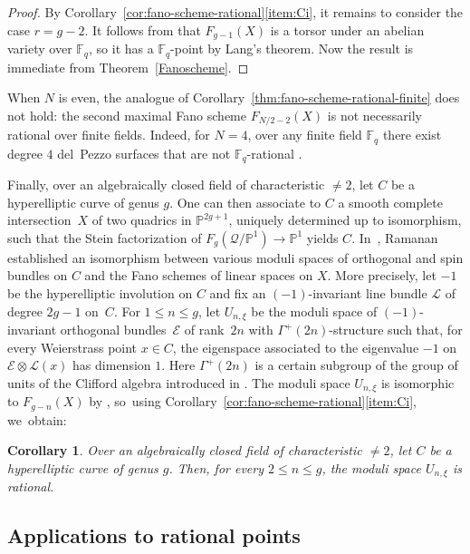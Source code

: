 \documentclass[JEP,XML,SOM,Unicode,NoEqCountersInSection,published]{cedram}
\let\bb\mathbb\let\Bbb\mathbb
\theoremstyle{plain}
\newtheorem{cor}[thm]{Corollary}
\theoremstyle{definition}
\renewcommand\P{\mathbb{P}}
\newcommand\F{\mathbb{F}}
\begin{document}
\begin{proof}
By Corollary~\ref{cor:fano-scheme-rational}\eqref{item:Ci}, it remains to consider the case $r=g-2$.
It follows from \cite[Th.\,4.8]{Reid-thesis} that $F_{g-1}(X)$ is a torsor under an abelian variety over \(\bb F_q\),
so it has a \(\bb F_q\)-point by Lang's theorem.
Now the result is immediate from Theorem~\ref{Fanoscheme}.
\end{proof}

When $N$ is even, the analogue of Corollary~\ref{thm:fano-scheme-rational-finite} does not hold: the second maximal Fano scheme \(F_{N/2 - 2}(X)\) is not necessarily rational over finite fields.
Indeed, for $N=4$, over any finite field $\F_q$ there exist degree $4$ del~Pezzo surfaces that are not \(\bb F_q\)-rational \cite[Th.\,3.2]{rybakov05}.

Finally, over an algebraically closed field of characteristic $\neq 2$, let $C$ be a hyperelliptic curve of genus $g$.
One can then associate to $C$ a smooth complete intersection~$X$ of two quadrics in $\P^{2g+1}$, uniquely determined up to isomorphism, such that the Stein factorization of $F_{g}(\mathcal{Q}/\P^1)\to \P^1$ yields $C$. In~\cite{Ramanan81}, Ramanan established an isomorphism between various moduli spaces of orthogonal and spin bundles on $C$ and the Fano schemes of linear spaces on $X$.
More precisely, let $-1$ be the hyperelliptic involution
on $C$ and fix an $(-1)$-invariant line bundle $\mathcal{L}$ of degree $2g-1$ on~$C$.
For $1\leq n\leq g$, let $U_{n,\xi}$ be the moduli space of $(-1)$-invariant orthogonal bundles~$\mathcal{E}$ of rank~$2n$ with $\Gamma^+(2n)$-structure such that, for every Weierstrass point $x\in C$, the eigenspace associated to the eigenvalue $-1$ on $\mathcal{E}\otimes \mathcal{L}(x)$ has dimension $1$.
Here $\Gamma^+(2n)$ is a certain subgroup of the group of units of the Clifford algebra introduced in \hbox{\cite[\S 2]{Ramanan81}}.
The moduli space $U_{n,\xi}$ is isomorphic to $F_{g-n}(X)$ by \cite[Th.\,3]{Ramanan81}, so~using Corollary~\ref{cor:fano-scheme-rational}\eqref{item:Ci}, we~obtain:
\begin{cor}\label{thm:modulirational}
Over an algebraically closed field of characteristic $\neq 2$,
let $C$ be a hyperelliptic curve of genus $g$.
Then, for every $2\leq n\leq g$, the moduli space $U_{n,\xi}$ is rational.
\end{cor}

\subsection{Applications to rational points}\label{sec:arithmetic-applications}
\end{document}
